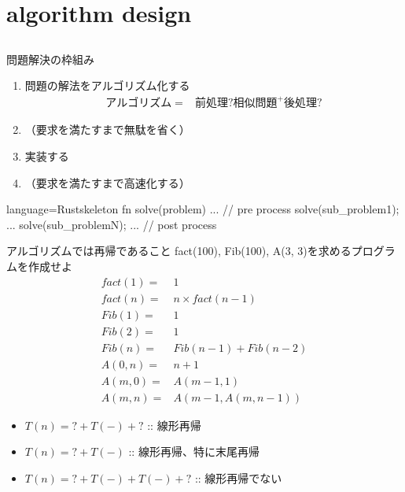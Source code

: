 \documentclass{beamer}
\subtitle{練習問題}
\begin{document}
\begin{frame}[fragile]{}
\titlepage
\end{frame}

\section{algorithm design}		%
\subsection{}

\begin{frame}[fragile]{問題解決の枠組み}{}
\begin{enumerate}%
\item 問題の解法をアルゴリズム化する\footnotemark
\begin{align*}
アルゴリズム = & 前処理? 相似問題^{+} 後処理?
\end{align*}
\item （要求を満たすまで無駄を省く）
\item 実装する
\item （要求を満たすまで高速化する）
\end{enumerate}

\vfill

\begin{codeof}{language=Rust}{skeleton}
fn solve(problem) {
  ...   // pre process
  solve(sub_problem1);
  ...
  solve(sub_problemN);
  ...    // post process
}
\end{codeof}

\end{frame}

\begin{frame}[fragile]{アルゴリズムでは再帰であること}{}
fact(100), Fib(100), A(3, 3)を求めるプログラムを作成せよ
\begin{align*}
fact(1) =& 1 \\
fact(n) =& n \times fact(n - 1)\\
Fib(1) =& 1 \\
Fib(2) =& 1 \\
Fib(n) =& Fib(n - 1) + Fib(n -2) \\
A(0, n) =& n + 1 \\
A(m, 0) =& A(m - 1, 1) \\
A(m, n) =& A(m - 1, A(m, n - 1))
\end{align*}

\begin{itemize}%
\item $T(n) = ? + T(-) + ?$ :: 線形再帰
\item $T(n) = ? + T(-)$ :: 線形再帰、特に末尾再帰
\item $T(n) = ? + T(-) + T(-) + ?$ :: 線形再帰でない
\end{itemize}
\end{frame}
\end{document}
